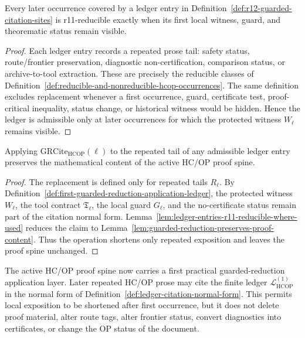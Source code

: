 \begin{lemma}
\label{lem:ledger-entries-r11-reducible-where-used}
Every later occurrence covered by a ledger entry in Definition~\ref{def:r12-guarded-citation-sites} is r11-reducible exactly when its first local witness, guard, and theorematic status remain visible.
\end{lemma}

\begin{proof}
Each ledger entry records a repeated prose tail: safety status, route/frontier preservation, diagnostic non-certification, comparison status, or archive-to-tool extraction.  These are precisely the reducible classes of Definition~\ref{def:reducible-and-nonreducible-hcop-occurrences}.  The same definition excludes replacement whenever a first occurrence, guard, certificate test, proof-critical inequality, status change, or historical witness would be hidden.  Hence the ledger is admissible only at later occurrences for which the protected witness \(W_{\ell}\) remains visible.
\end{proof}

\begin{proposition}
\label{prop:first-guarded-reduction-application-conservative}
Applying \(\mathrm{GRCite}_{\mathrm{HCOP}}(\ell)\) to the repeated tail of any admissible ledger entry preserves the mathematical content of the active HC/OP proof spine.
\end{proposition}

\begin{proof}
The replacement is defined only for repeated tails \(R_{\ell}\).  By Definition~\ref{def:first-guarded-reduction-application-ledger}, the protected witness \(W_{\ell}\), the tool contract \(\mathfrak T_{\ell}\), the local guard \(G_{\ell}\), and the no-certificate status remain part of the citation normal form.  Lemma~\ref{lem:ledger-entries-r11-reducible-where-used} reduces the claim to Lemma~\ref{lem:guarded-reduction-preserves-proof-content}.  Thus the operation shortens only repeated exposition and leaves the proof spine unchanged.
\end{proof}

\begin{theorem}
\label{thm:first-guarded-reduction-application-theorem}
The active HC/OP proof spine now carries a first practical guarded-reduction application layer.  Later repeated HC/OP prose may cite the finite ledger \(\mathcal L_{\mathrm{HCOP}}^{(1)}\) in the normal form of Definition~\ref{def:ledger-citation-normal-form}.  This permits local exposition to be shortened after first occurrence, but it does not delete proof material, alter route tags, alter frontier status, convert diagnostics into certificates, or change the OP status of the document.
\end{theorem}

